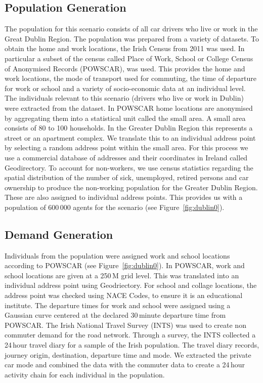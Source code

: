 \subsection{Population Generation}
The population for this scenario consists of all car drivers who live or work in the Great Dublin Region. The population was prepared from a variety of datasets. To obtain the home and work locations, the Irish Census from 2011 was used. In particular a subset of the census called Place of Work, School or College Census of Anonymised Records (POWSCAR), was used. This provides the home and work locations, the mode of transport used for commuting, the time of departure for work or school and a variety of socio-economic data at an individual level. The individuals relevant to this scenario (drivers who live or work in Dublin) were extracted from the dataset. In POWSCAR home locations are anonymised by aggregating them into a statistical unit called the small area. A small area consists of 80 to 100 households.  In the Greater Dublin Region this represents a street or an apartment complex.  We translate this to an individual address point by selecting a random address point within the small area.  For this process we use a commercial database of addresses and their coordinates in Ireland called Geodirectory. To account for non-workers, we use census statistics regarding the spatial distribution of the number of sick, unemployed, retired persons and car ownership to produce the non-working population for the Greater Dublin Region.  These are also assigned to individual address points. This provides us with a population of 600\,000 agents for the scenario (see Figure~\ref{fig:dublin0}).

\subsection{Demand Generation}
Individuals from the population were assigned work and school locations according to POWSCAR (see Figure~\ref{fig:dublin0}). In POWSCAR, work and school locations are given at a 250\,M grid level. This was translated into an individual address point using Geodriectory. For school and collage locations, the address point was checked using NACE Codes, to ensure it is an educational institute. The departure times for work  and school were assigned using a Gaussian curve centered at the declared 30\,minute departure time from POWSCAR. The Irish National Travel Survey (INTS) was used to create non commuter demand for the road network. Through a survey, the INTS collected a 24\,hour travel diary for a sample of the Irish population. The travel diary records, journey origin, destination, departure time and mode. We extracted the private car mode and combined the data with the commuter data to create a 24\,hour activity chain for each individual in the population.

